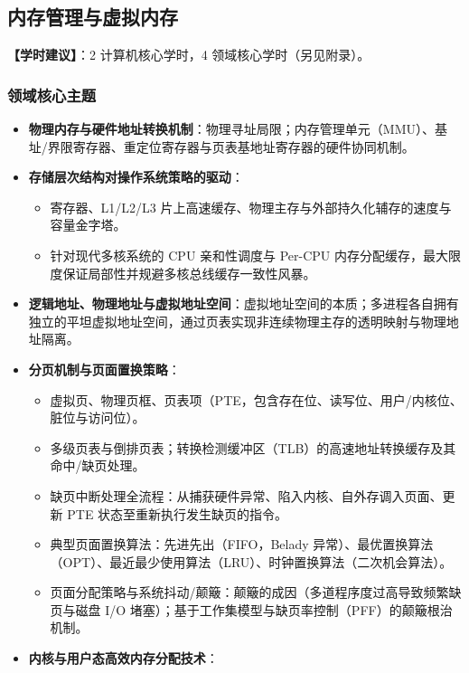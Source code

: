 \subsection{内存管理与虚拟内存}
\textbf{【学时建议】}：2 计算机核心学时，4 领域核心学时（另见附录）。

\subsubsection{领域核心主题}
\begin{itemize}\setlength{\itemsep}{0pt}\setlength{\parskip}{0pt}
    \item \textbf{物理内存与硬件地址转换机制}：物理寻址局限；内存管理单元（MMU）、基址/界限寄存器、重定位寄存器与页表基地址寄存器的硬件协同机制。
    \item \textbf{存储层次结构对操作系统策略的驱动}：
    \begin{itemize}\setlength{\itemsep}{0pt}\setlength{\parskip}{0pt}
        \item 寄存器、L1/L2/L3 片上高速缓存、物理主存与外部持久化辅存的速度与容量金字塔。
        \item 针对现代多核系统的 CPU 亲和性调度与 Per-CPU 内存分配缓存，最大限度保证局部性并规避多核总线缓存一致性风暴。
    \end{itemize}
    \item \textbf{逻辑地址、物理地址与虚拟地址空间}：虚拟地址空间的本质；多进程各自拥有独立的平坦虚拟地址空间，通过页表实现非连续物理主存的透明映射与物理地址隔离。
    \item \textbf{分页机制与页面置换策略}：
    \begin{itemize}\setlength{\itemsep}{0pt}\setlength{\parskip}{0pt}
        \item 虚拟页、物理页框、页表项（PTE，包含存在位、读写位、用户/内核位、脏位与访问位）。
        \item 多级页表与倒排页表；转换检测缓冲区（TLB）的高速地址转换缓存及其命中/缺页处理。
        \item 缺页中断处理全流程：从捕获硬件异常、陷入内核、自外存调入页面、更新 PTE 状态至重新执行发生缺页的指令。
        \item 典型页面置换算法：先进先出（FIFO，Belady 异常）、最优置换算法（OPT）、最近最少使用算法（LRU）、时钟置换算法（二次机会算法）。
        \item 页面分配策略与系统抖动/颠簸：颠簸的成因（多道程序度过高导致频繁缺页与磁盘 I/O 堵塞）；基于工作集模型与缺页率控制（PFF）的颠簸根治机制。
    \end{itemize}
    \item \textbf{内核与用户态高效内存分配技术}：

\end{itemize}
